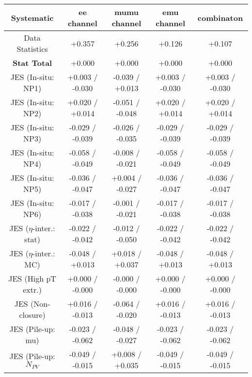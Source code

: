 
 \begin{table}[htbp]
\scriptsize
  \begin{center} 
  \begin{tabular}{|c|c|c|c|c|}
  \hline
Systematic                            &  ee channel&  mumu channel&  emu channel&  combinaton\\
  \hline
Data Statistics                       &+0.357              & +0.256              & +0.126              & +0.107             \\
\hline
\textbf{Stat Total}                   &+0.000              & +0.000              & +0.000              & +0.000             \\
\hline
JES (In-situ: NP1)                    &+0.003   / -0.030   & -0.039   / +0.013   & +0.003   / -0.030   & +0.003   / -0.030  \\
JES (In-situ: NP2)                    &+0.020   / +0.014   & -0.051   / -0.048   & +0.020   / +0.014   & +0.020   / +0.014  \\
JES (In-situ: NP3)                    &-0.029   / -0.039   & -0.026   / -0.035   & -0.029   / -0.039   & -0.029   / -0.039  \\
JES (In-situ: NP4)                    &-0.058   / -0.049   & -0.008   / -0.021   & -0.058   / -0.049   & -0.058   / -0.049  \\
JES (In-situ: NP5)                    &-0.036   / -0.047   & +0.004   / -0.027   & -0.036   / -0.047   & -0.036   / -0.047  \\
JES (In-situ: NP6)                    &-0.017   / -0.038   & -0.001   / -0.021   & -0.017   / -0.038   & -0.017   / -0.038  \\
JES ($\eta$-inter.: stat)               &-0.022   / -0.042   & -0.012   / -0.050   & -0.022   / -0.042   & -0.022   / -0.042  \\
JES ($\eta$-inter.: MC)                 &-0.048   / +0.013   & +0.018   / +0.037   & -0.048   / +0.013   & -0.048   / +0.013  \\
JES (High pT extr.)                  &+0.000   / -0.000   & -0.000   / -0.000   & +0.000   / -0.000   & +0.000   / -0.000  \\
JES (Non-closure)                     &+0.016   / -0.013   & -0.064   / -0.020   & +0.016   / -0.013   & +0.016   / -0.013  \\
JES (Pile-up: mu)                     &-0.023   / -0.062   & -0.048   / -0.027   & -0.023   / -0.062   & -0.023   / -0.062  \\
JES (Pile-up: $N_{PV}$                  &-0.049   / -0.015   & +0.008   / +0.035   & -0.049   / -0.015   & -0.049   / -0.015  \\

\end{tabular}
\end{center}
\end{table}

